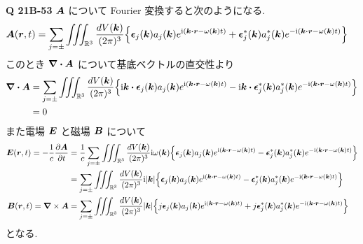 \documentclass[a4paper,dvipdfmx]{jsarticle}
\theoremstyle{definition}
\begin{document}
\textbf{Q 21B-53}
$\AA$ について Fourier 変換すると次のようになる.
\begin{align}
  \AA(\rr, t) & = \sum_{j=\pm}\iiint_{\RR^3}\frac{dV(\kk)}{(2\pi)^3}\qty{\ee_j(\kk)a_j(\kk)e^{\ii(\kk\vdot\rr - \omega(\kk)t)} + \ee_j^*(\kk)a_j^*(\kk)e^{-\ii(\kk\vdot\rr - \omega(\kk)t)}}
\end{align}
このとき $\vnabla\vdot\AA$ について基底ベクトルの直交性より
\begin{align}
  \vnabla\vdot\AA & = \sum_{j=\pm}\iiint_{\RR^3}\frac{dV(\kk)}{(2\pi)^3}\qty{\ii\kk\vdot\ee_j(\kk)a_j(\kk)e^{\ii(\kk\vdot\rr - \omega(\kk)t)} - \ii\kk\vdot\ee_j^*(\kk)a_j^*(\kk)e^{-\ii(\kk\vdot\rr - \omega(\kk)t)}} \\
                  & = 0
\end{align}
また電場 $\EE$ と磁場 $\BB$ について
\begin{align}
  \EE(\rr, t) = -\frac{1}{c}\pdv{\AA}{t} & = \frac{1}{c}\sum_{j=\pm}\iiint_{\RR^3}\frac{dV(\kk)}{(2\pi)^3}\ii\omega(\kk)\qty{\ee_j(\kk)a_j(\kk)e^{\ii(\kk\vdot\rr - \omega(\kk)t)} - \ee_j^*(\kk)a_j^*(\kk)e^{-\ii(\kk\vdot\rr - \omega(\kk)t)}} \\
                                         & = \sum_{j=\pm}\iiint_{\RR^3}\frac{dV(\kk)}{(2\pi)^3}\ii|\kk|\qty{\ee_j(\kk)a_j(\kk)e^{\ii(\kk\vdot\rr - \omega(\kk)t)} - \ee_j^*(\kk)a_j^*(\kk)e^{-\ii(\kk\vdot\rr - \omega(\kk)t)}}                  \\
  \BB(\rr, t) = \vnabla\times\AA         & = \sum_{j=\pm}\iiint_{\RR^3}\frac{dV(\kk)}{(2\pi)^3}|\kk|\qty{j\ee_j(\kk)a_j(\kk)e^{\ii(\kk\vdot\rr - \omega(\kk)t)} + j\ee_j^*(\kk)a_j^*(\kk)e^{-\ii(\kk\vdot\rr - \omega(\kk)t)}}
\end{align}
となる. \\
\end{document}
